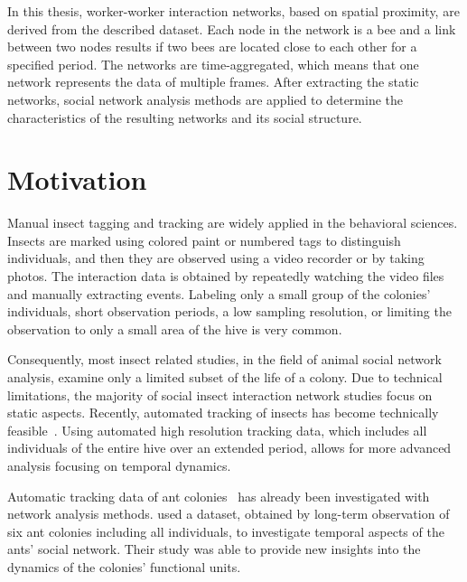 In this thesis, worker-worker interaction networks, based on spatial proximity, are derived from the described dataset. Each node in the network is a bee and a link between two nodes results if two bees are located close to each other for a specified period.
The networks are time-aggregated, which means that one network represents the data of multiple frames.
After extracting the static networks, social network analysis methods are applied to determine the characteristics of the resulting networks and its social structure.

\section{Motivation}
\label{sec:intro:motivation}
Manual insect tagging and tracking are widely applied in the behavioral sciences.
Insects are marked using colored paint or numbered tags to distinguish individuals, and then they are observed using a video recorder or by taking photos.
The interaction data is obtained by repeatedly watching the video files and manually extracting events.
Labeling only a small group of the colonies’ individuals, short observation periods, a low sampling resolution, or limiting the observation to only a small area of the hive is very common.

Consequently, most insect related studies, in the field of animal social network analysis, examine only a limited subset of the life of a colony.
Due to technical limitations, the majority of social insect interaction network studies focus on static aspects.
Recently, automated tracking of insects has become technically feasible~\cite{wario2015automatic, crall2015beetag, fiala2005comparing}.
Using automated high resolution tracking data, which includes all individuals of the entire hive over an extended period, allows for more advanced analysis focusing on temporal dynamics.

Automatic tracking data of ant colonies~\cite{mersch2013tracking}
has already been investigated with network analysis methods.
\textcite{mersch2013tracking} used a dataset, obtained by long-term observation of six ant colonies including all individuals, to investigate temporal aspects
of the ants’ social network.
Their study was able to provide new insights into the dynamics of the colonies’ functional units.

